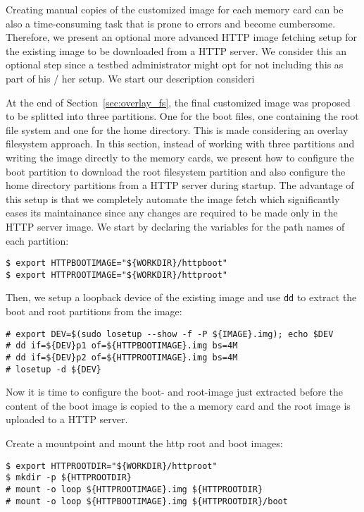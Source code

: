 \label{sec:testbed_http}
Creating manual copies of the customized image for each memory card can
be also a time-consuming task that is prone to errors and become
cumbersome. Therefore, we present an optional more advanced \ac{HTTP}
image fetching setup for the existing image to be downloaded from a
\ac{HTTP} server. We consider this an optional step since a testbed
administrator might opt for not including this as part of his / her setup.
We start our description consideri

At the end of Section~\ref{sec:overlay_fs}, the final customized image was
proposed to be splitted into three partitions. One for the boot files, one
containing the root file system and one for the home directory. This is made
considering an overlay filesystem approach. In this section, instead of
working with three partitions and writing the image directly to the memory
cards, we present how to configure the boot partition to download the root
filesystem partition and also configure the home directory partitions
from a \ac{HTTP} server during startup. The advantage of this setup is that
we completely automate the image fetch which significantly eases its
maintainance since any changes are required to be made only in the \ac{HTTP}
server image. We start by declaring the variables for the path names of each
partition:

\begin{lstlisting}[]
$ export HTTPBOOTIMAGE="${WORKDIR}/httpboot"
$ export HTTPROOTIMAGE="${WORKDIR}/httproot"
\end{lstlisting}
\FloatBarrier
\vspace{-5mm}

Then, we setup a loopback device of the existing image and use \texttt{dd} to
extract the boot and root partitions from the image:
\begin{lstlisting}[]
# export DEV=$(sudo losetup --show -f -P ${IMAGE}.img); echo $DEV
# dd if=${DEV}p1 of=${HTTPBOOTIMAGE}.img bs=4M
# dd if=${DEV}p2 of=${HTTPROOTIMAGE}.img bs=4M
# losetup -d ${DEV}
\end{lstlisting}
\FloatBarrier
\vspace{-5mm}

Now it is time to configure the boot- and root-image just extracted before
the content of the boot image is copied to the a memory card and the root
image is uploaded to a \ac{HTTP} server.

Create a mountpoint and mount the http root and boot images:
\begin{lstlisting}[]
$ export HTTPROOTDIR="${WORKDIR}/httproot"
$ mkdir -p ${HTTPROOTDIR}
# mount -o loop ${HTTPROOTIMAGE}.img ${HTTPROOTDIR}
# mount -o loop ${HTTPBOOTIMAGE}.img ${HTTPROOTDIR}/boot
\end{lstlisting}
\FloatBarrier
\vspace{-5mm}

